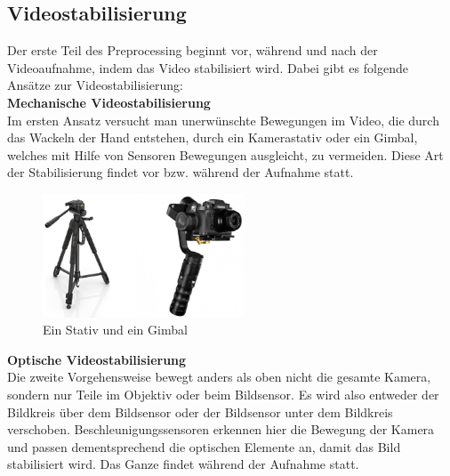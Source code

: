 \documentclass[conference]{IEEEtran}
\begin{document}
	\subsection{Videostabilisierung}
	Der erste Teil des Preprocessing beginnt vor, während und nach der Videoaufnahme, indem das Video stabilisiert wird. Dabei gibt es folgende Ansätze zur Videostabilisierung:\\
	\textbf{Mechanische Videostabilisierung}\\
	Im ersten Ansatz versucht man unerwünschte Bewegungen im Video, die durch das Wackeln der Hand entstehen, durch ein Kamerastativ oder ein Gimbal, welches mit Hilfe von Sensoren Bewegungen ausgleicht, zu vermeiden. Diese Art der Stabilisierung findet vor bzw. während der Aufnahme statt.\\
	\begin{figure}[!h]
		\begin{center}
			\includegraphics[width=6cm]{Media/GimbalStativ.png}
			\caption{Ein Stativ und ein Gimbal \cite{g1}\cite{g2}}
			\label{GS}
		\end{center}
	\end{figure}
	\textbf{Optische Videostabilisierung}\\
	Die zweite Vorgehensweise bewegt anders als oben nicht die gesamte Kamera, sondern nur Teile im Objektiv oder beim Bildsensor. Es wird also entweder der Bildkreis über dem Bildsensor oder der Bildsensor unter dem Bildkreis verschoben. Beschleunigungssensoren erkennen hier die Bewegung der Kamera und passen dementsprechend die optischen Elemente an, damit das Bild stabilisiert wird. Das Ganze findet während der Aufnahme statt.
	
\end{document}
